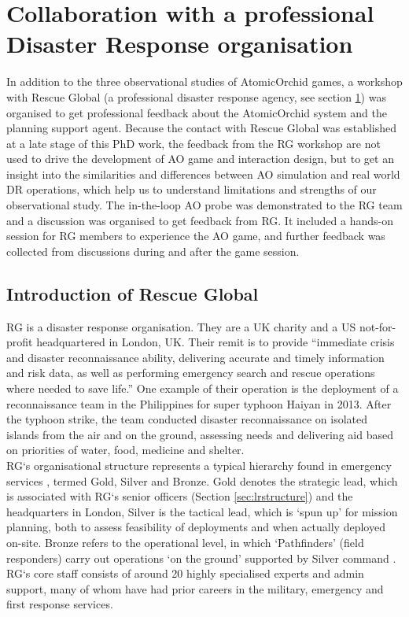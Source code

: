 \section{Collaboration with a professional Disaster Response organisation}\label{sec:rg}
In addition to the three observational studies of AtomicOrchid games, a workshop with Rescue Global (a professional disaster response agency, see section \ref{sec:rg}) was organised to get professional feedback about the AtomicOrchid system and the planning support agent. Because the contact with Rescue Global was established at a late stage of this PhD work, the feedback from the \ac{RG} workshop are not used to drive the development of \ac{AO} game and interaction design, but to get an insight into the similarities and differences between \ac{AO} simulation and real world \ac{DR} operations, which help us to understand limitations and strengths of our observational study. The in-the-loop \ac{AO} probe was demonstrated to the \ac{RG} team and a discussion was organised to get feedback from \ac{RG}. It included a hands-on session for \ac{RG} members to experience the \ac{AO} game, and further feedback was collected from discussions during and after the game session.\\

\subsection{Introduction of Rescue Global}
\acf{RG} is a disaster response organisation. They are a UK charity and a US not-for-profit headquartered in London, UK. Their remit is to provide ``immediate crisis and disaster reconnaissance ability, delivering accurate and timely information and risk data, as well as performing emergency search and rescue operations where needed to save life.'' One example of their operation is the deployment of a reconnaissance team in the Philippines for super typhoon Haiyan in 2013. After the typhoon strike, the team conducted disaster reconnaissance on isolated islands from the air and on the ground, assessing needs and delivering aid based on priorities of water, food, medicine and shelter.\\

\ac{RG}`s organisational structure represents a typical hierarchy found in emergency services \citep{U.S.DepartmentofHomelandSecurity2008}, termed Gold, Silver and Bronze. Gold denotes the strategic lead, which is associated with \ac{RG}`s senior officers (Section \ref{sec:lrstructure}) and the headquarters in London, Silver is the tactical lead, which is `spun up' for mission planning, both to assess feasibility of deployments and when actually deployed on-site. Bronze refers to the operational level, in which `Pathfinders' (field responders) carry out operations `on the ground' supported by Silver command \citep{RescueGlobal2012}. \ac{RG}`s core staff consists of around 20 highly specialised experts and admin support, many of whom have had prior careers in the military, emergency and first response services.\\

